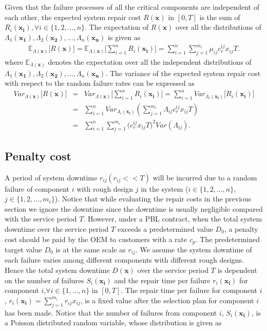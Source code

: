 \documentclass[preprint,12pt]{elsarticle}
\begin{document}
Given that the failure processes of all the critical components are independent of each other, the expected system repair cost $R(\boldsymbol{x})$ in $[0,T]$ is the sum of $R_{i}(\boldsymbol{x_i}), \forall i \in \{1,2,...,n\}$. The expectation of $R(\boldsymbol{x})$ over all the distributions of $\Lambda_{1}(\boldsymbol{x_{1}}),\Lambda_{2}(\boldsymbol{x_{2}}),..., \Lambda_{n}(\boldsymbol{x_{n}})$ is given as
\begin {eqnarray}
\mathbb{E}_{\Lambda(\boldsymbol{x})} \bigg[ R(\boldsymbol{x}) \bigg]= \mathbb{E}_{\Lambda(\boldsymbol{x})} \bigg[ \sum_{i=1}^{n}R_{i}(\boldsymbol{x_{i}}) \bigg]=\sum_{i=1}^{n}\sum_{j=1}^{m_{i}}{\mu_{ij}c_r^{ij}x_{ij}}T. \label{ER}
\end {eqnarray}
where $\mathbb{E}_{\Lambda(\boldsymbol{x})}$ denotes the expectation over all the independent distributions of $\Lambda_{1}(\boldsymbol{x_{1}}),\Lambda_{2}(\boldsymbol{x_{2}}),..., \Lambda_{n}(\boldsymbol{x_{n}})$.
The variance of the expected system repair cost with respect to the random failure rates can be expressed as
\begin {eqnarray}
 Var_{\Lambda(\boldsymbol{x})} \bigg[ R(\boldsymbol{x}) \bigg]  &=&Var_{\Lambda(\boldsymbol{x})} \bigg[ \sum_{i=1}^{n}R_{i}(\boldsymbol{x_{i}}) \bigg]
= \sum_{i=1}^{n} Var_{\Lambda_i(\boldsymbol{x_{i}})}\bigg[R_{i}(\boldsymbol{x_i})\bigg] \nonumber \\
 &=& \sum_{i=1}^{n} Var_{\Lambda_i(\boldsymbol{x_{i}})}(\sum_{j=1}^{m_{i}}{\Lambda_{ij}c_r^{ij}x_{ij}}T) \nonumber\\
&=& \sum_{i=1}^{n} \sum_{j=1}^{m_{i}}{(c_r^{ij}x_{ij}}T)^2 Var(\Lambda_{ij}).
\end {eqnarray}

\subsection{Penalty cost}
A period of system downtime $r_{ij}(r_{ij}<<T)$ will be incurred due to a random failure of component $i$ with rough design $j$ in the system ($i \in \{1,2,...,n\}$, $j \in \{1,2,...,m_i\}$). Notice that while evaluating the repair costs in the previous section we ignore the downtime since the downtime is usually negligible compared with the service period $T$. However, under a PBL contract, when the total system downtime over the service period $T$ exceeds a predetermined value $D_0$, a penalty cost should be paid by the OEM to customers with a rate $c_p$. The predetermined target value $D_0$ is at the same scale as $r_{ij}$. We assume the system downtime of each failure varies among different components with different rough designs. Hence the total system downtime $D{(\boldsymbol{x})}$ over the service period $T$ is dependent on the number of failures $S_{i}(\boldsymbol{x_{i}})$ and the repair time per failure $r_{i}(\boldsymbol{x_{i}})$ for component $i$,$\forall i\in \{1,\dots,n\}$ in $[0,T]$. The repair time per failure for component $i$, $r_{i}(\boldsymbol{x_{i}})=\sum_{j=1}^{m_{i}}{r_{ij}x_{ij}}$, is a fixed value after the selection plan for component $i$ has been made. Notice that the number of failures from component $i$, $S_{i}(\boldsymbol{x_i})$, is a Poisson distributed random variable, whose distribution is given as
\end{document}
